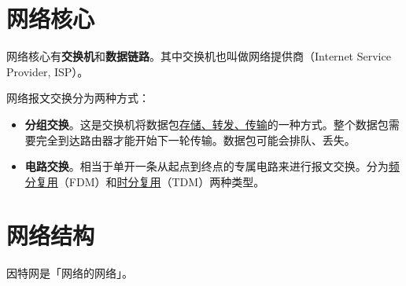 \documentclass[UTF8]{ctexart}
\begin{document}
\BgThispage
\section{网络核心}
网络核心有\textbf{交换机}和\textbf{数据链路}。其中交换机也叫做网络提供商（Internet Service Provider, ISP）。

网络报文交换分为两种方式：
\begin{itemize}[itemsep=0pt,parsep=0pt]
  \item \textbf{分组交换}。这是交换机将数据包\underline{存储、转发、传输}的一种方式。整个数据包需要完全到达路由器才能开始下一轮传输。数据包可能会排队、丢失。

  \item \textbf{电路交换}。相当于单开一条从起点到终点的专属电路来进行报文交换。分为\underline{频分复用}（FDM）和\underline{时分复用}（TDM）两种类型。
\end{itemize}

\section{网络结构}
因特网是「网络的网络」。
\end{document}
